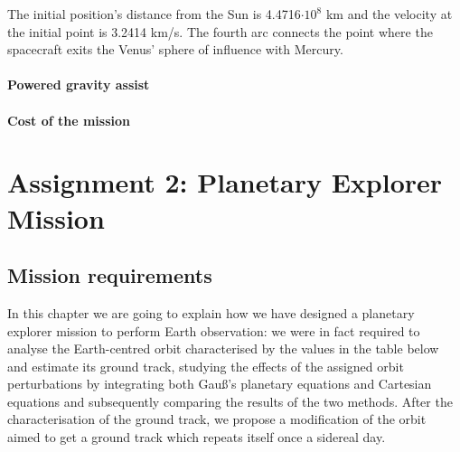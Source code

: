 \documentclass[11pt,a4paper]{report}
\begin{document}
The initial position’s distance from the Sun is 4.4716$\cdot 10^8$ km and the velocity at the initial point is 3.2414 km/s.
The fourth arc connects the point where the spacecraft exits the Venus’ sphere of influence with Mercury.

\subsection{Powered gravity assist}

\subsection{Cost of the mission}

\part{Assignment 2: Planetary Explorer Mission}

\chapter{Mission requirements}
In this chapter we are going to explain how we have designed a planetary explorer
mission to perform Earth observation: we were in fact required to analyse the Earth-centred orbit characterised by the values in the table below and estimate its ground track, studying the effects of the assigned orbit perturbations by integrating both Gauß’s planetary equations and Cartesian equations and subsequently comparing the results of the two methods. After the characterisation of the ground track, we propose a modification of the orbit aimed to get a ground track which repeats itself once a sidereal day.\\
\end{document}
